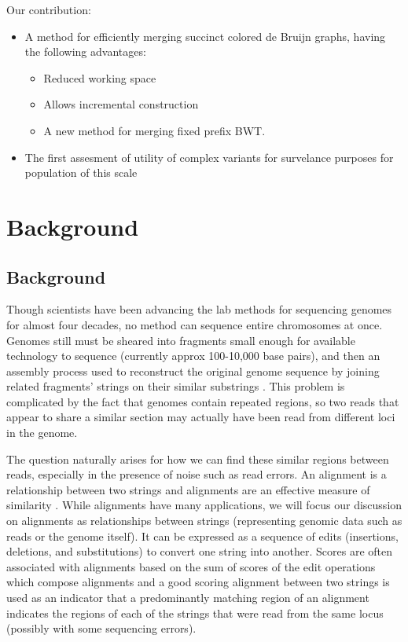 \documentclass[doctor]{thesis}
\begin{document}
Our contribution:
\begin{itemize}
\item A method for efficiently merging succinct colored de Bruijn graphs, having the following advantages:
  \begin{itemize}
  \item Reduced working space
  \item Allows incremental construction
    \item A new method for merging fixed prefix BWT.
  \end{itemize}
\item The first assesment of utility of complex variants for survelance purposes for population of this scale
  \end{itemize}

\chapter{Background}
\makeatletter{}\section{Background}


Though scientists have been advancing the lab methods for sequencing genomes for almost four decades, no method can sequence entire chromosomes at once. Genomes still must  be sheared into fragments small enough for available technology to sequence (currently approx 100-10,000 base pairs), and then an assembly process used to reconstruct the original genome sequence by joining related fragments' strings on their similar substrings \cite{nagarajan2013sequence,staden1980new}.
This problem is complicated by the fact that genomes contain repeated regions, so two reads that appear to share a similar section may actually have been read from different loci in the genome.

The question naturally arises for how we can find these similar regions between reads, especially in the presence of noise such as read errors.  
An alignment is a relationship between two strings and alignments are an effective measure of similarity \cite{needleman1970general}.  While alignments have many applications, we will focus our discussion on alignments as relationships between strings (representing genomic data such as reads or the genome itself).
It can be expressed as a sequence of edits (insertions, deletions, and substitutions) to convert one string into another.
Scores are often associated with alignments based on the sum of scores of the edit operations which compose alignments and a good scoring alignment between two strings is used as an indicator that a predominantly matching region of an alignment indicates the regions of each of the strings that were read from the same locus (possibly with some sequencing errors).
\end{document}
